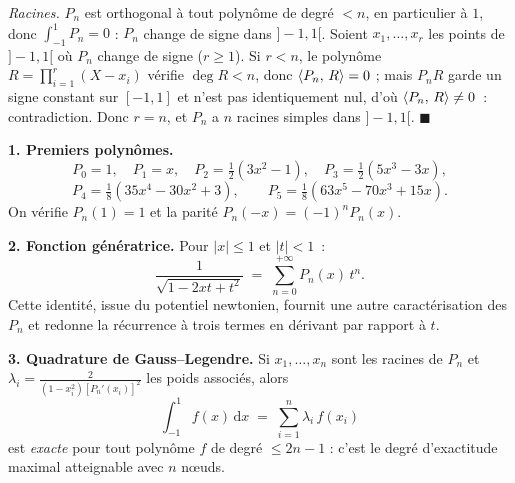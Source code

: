 \begin{mdframed}[style=proofbar]
  \smallskip
  \emph{Racines.} $P_n$ est orthogonal à tout polynôme de degré $<n$, en
  particulier à $1$, donc $\int_{-1}^1 P_n=0$ : $P_n$ change de signe dans
  $]-1,1[$. Soient $x_1,\ldots,x_r$ les points de $]-1,1[$ où $P_n$ change de
  signe ($r\geq 1$). Si $r<n$, le polynôme $R=\prod_{i=1}^r(X-x_i)$ vérifie
  $\deg R<n$, donc $\langle P_n,\,R\rangle=0$ ; mais $P_n R$ garde un signe constant
  sur $[-1,1]$ et n'est pas identiquement nul, d'où $\langle P_n,\,R\rangle\neq 0$~:
  contradiction. Donc $r=n$, et $P_n$ a $n$ racines simples dans
  $]-1,1[$.
  \hfill$\blacksquare$
\end{mdframed}

\decsep{}



\begin{mdframed}[style=exbar]
  \textbf{1. Premiers polynômes.}
  \[
    P_0=1,\quad P_1=x,\quad P_2=\tfrac{1}{2}(3x^2-1),\quad
    P_3=\tfrac{1}{2}(5x^3-3x),
  \]
  \[
    P_4=\tfrac{1}{8}(35x^4-30x^2+3),\qquad
    P_5=\tfrac{1}{8}(63x^5-70x^3+15x).
  \]
  On vérifie $P_n(1)=1$ et la parité $P_n(-x)={(-1)}^n P_n(x)$.

  \smallskip\noindent
  \textbf{2. Fonction génératrice.}\enspace{}
  Pour $|x|\leq 1$ et $|t|<1$~:
  \[
    \frac{1}{\sqrt{1-2xt+t^2}} \;=\; \sum_{n=0}^{+\infty} P_n(x)\,t^n.
  \]
  Cette identité, issue du potentiel newtonien, fournit une autre
  caractérisation des $P_n$ et redonne la récurrence à trois termes en
  dérivant par rapport à $t$.

  \smallskip\noindent
  \textbf{3. Quadrature de Gauss--Legendre.}\enspace%
  Si $x_1,\ldots,x_n$ sont les racines de $P_n$ et
  $\lambda_i=\frac{2}{(1-x_i^2){[P_n'(x_i)]}^2}$ les poids associés, alors
  \[
    \int_{-1}^{1} f(x)\,\mathrm{d}x \;=\; \sum_{i=1}^{n}\lambda_i\,f(x_i)
  \]
  est \emph{exacte} pour tout polynôme $f$ de degré $\leq 2n-1$ : c'est le
  degré d'exactitude maximal atteignable avec $n$ nœuds.
\end{mdframed}

\vspace{6pt}

